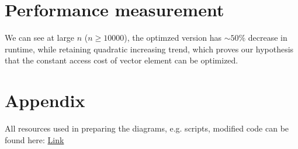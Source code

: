 \documentclass[a4paper]{article}
\begin{document}
\section{Performance measurement}
\par\vspace{-1.5em}
\par\vspace{3ex}
\begin{minipage}{0.45\linewidth}
    \noindent{}
    \end{minipage}\hfill
    \begin{minipage}{0.5\linewidth}
        We can see at large $n$ ($n \geq 10000$), the optimzed version has $\sim 50\%$ decrease in runtime, while retaining quadratic increasing trend,
        which proves our hypothesis that the constant access cost of vector element can be optimized.
    \end{minipage}\hfill
    \par\vspace{3ex}

\section{Appendix}
All resources used in preparing the diagrams, e.g. scripts, modified code can be found here: 
\href{https://github.com/Wxy2003-xy/CS3210-Lab-References}{Link}
\end{document}
